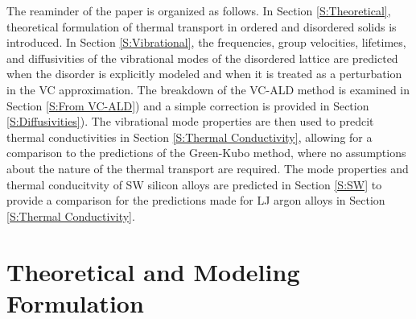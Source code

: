\documentclass[aps,prb,onecolumn,preprint,superscriptaddress,amsmath,amssymb,floatfix]{revtex4}
\begin{document}
The reaminder of the paper is organized as follows. 
In Section \ref{S:Theoretical}, theoretical 
formulation of thermal transport in ordered and disordered solids 
is introduced. In Section \ref{S:Vibrational}, the frequencies, 
group velocities, lifetimes, and diffusivities of the 
vibrational modes of the disordered lattice are 
predicted when the disorder is explicitly modeled and when it is 
treated as a perturbation in the VC approximation. 
The breakdown of the VC-ALD method is examined in 
Section \ref{S:From VC-ALD})  
and a simple correction is provided in Section \ref{S:Diffusivities}). 
The vibrational 
mode properties are then used to predcit thermal conductivities 
in Section \ref{S:Thermal Conductivity}, 
allowing for a comparison to the predictions of the 
Green-Kubo method, where no assumptions about the nature of the 
thermal transport are required. The mode properties and thermal 
conducitvity of SW silicon alloys are predicted in Section \ref{S:SW} 
to provide a comparison for the predictions made for LJ argon alloys 
in Section \ref{S:Thermal Conductivity}.




\section{\label{S:Theoretical}Theoretical and Modeling Formulation}
\end{document}
